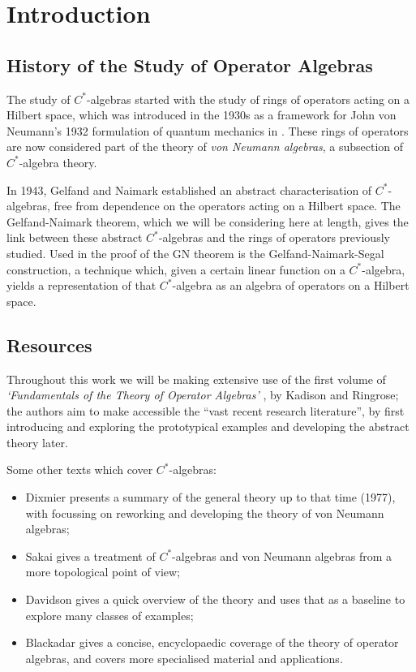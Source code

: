 \documentclass[11pt,a4paper]{report}
\theoremstyle{plain}
\theoremstyle{definition}
\newcommand{\1}{\mathbbm{1}}
\begin{document}
\chapter{Introduction}
\section{History of the Study of Operator Algebras}
The study of $C^\ast$-algebras started with the study of rings of operators 
acting on a Hilbert space, which was introduced in the 1930s as a framework for 
John von Neumann's 1932 formulation of quantum mechanics in \cite{vonneumann32}. 
These rings of operators are now considered part of the theory of \emph{von 
Neumann algebras}, a subsection of $C^\ast$-algebra theory. 



{In 1943, Gelfand and Naimark \cite{gelfand43} established an abstract 
characterisation of $C^\ast$-algebras, free from dependence on the operators 
acting on a Hilbert space. The Gelfand-Naimark theorem, which we will be 
considering here at length, gives the link between these abstract 
$C^\ast$-algebras and the rings of operators previously studied. Used in the 
proof of the GN theorem is the Gelfand-Naimark-Segal construction, a technique 
which, given a certain linear function on a $C^\ast$-algebra, yields a 
representation of that $C^\ast$-algebra as an algebra of operators on a Hilbert 
space.} 

\section{Resources}
Throughout this work we will be making extensive use of the first volume of 
\emph{`Fundamentals of the Theory of Operator Algebras'} 
\cite{kadison83,kadison86}, by Kadison and Ringrose; the authors aim to make 
accessible the ``vast recent research literature'', by first introducing and 
exploring the prototypical examples and developing the abstract theory later. 

	
Some other texts which cover $C^\ast$-algebras: 
\begin{itemize}
	\item 	Dixmier \cite{dixmier77} presents a summary of the general theory up to 
	that time (1977), with \cite{dixmier81} focussing on reworking and developing 
	the theory of von Neumann algebras; 
	\item 	Sakai \cite{sakai71} gives a treatment of $C^\ast$-algebras and von 
	Neumann algebras from a more topological point of view; 
	\item	Davidson \cite{davidson96} gives a quick overview of the theory and uses 
	that as a baseline to explore many classes of examples;
	\item 	Blackadar \cite{blackadar06} gives a concise, encyclopaedic coverage of 
	the theory of operator algebras, and covers more specialised material and 
	applications. 

\end{itemize}
	
\end{document}
